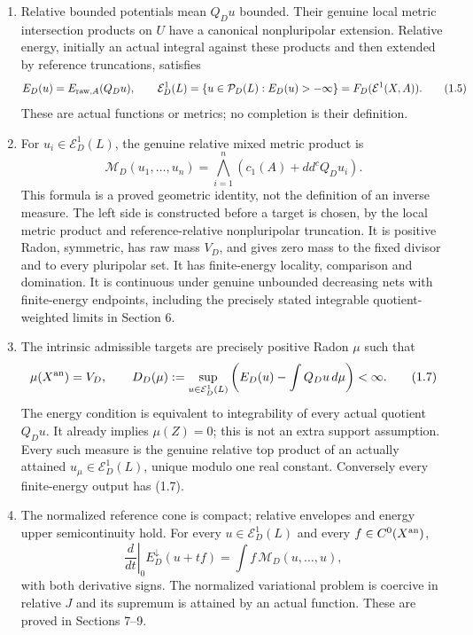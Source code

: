 \documentclass[
  10pt,
]{article}
\begin{document}
\begin{enumerate}
\def\labelenumi{\arabic{enumi}.}
\item
  Relative bounded potentials mean \(Q_Du\) bounded. Their genuine local
  metric intersection products on \(U\) have a canonical nonpluripolar
  extension. Relative energy, initially an actual integral against these
  products and then extended by reference truncations, satisfies \[
   E_D(u)=E_{{\rm raw},A}(Q_Du),\qquad
   \mathcal E_D^1(L)=\{u\in\mathcal P_D(L):E_D(u)>-\infty\}
                      =F_D(\mathcal E^1(X,A)).                \tag{1.5}
  \] These are actual functions or metrics; no completion is their
  definition.
\item
  For \(u_i\in\mathcal E_D^1(L)\), the genuine relative mixed metric
  product is \[
   \mathcal M_D(u_1,\ldots,u_n)
      =\bigwedge_{i=1}^n(c_1(A)+dd^c Q_Du_i).                 \tag{1.6}
  \] This formula is a proved geometric identity, not the definition of
  an inverse measure. The left side is constructed before a target is
  chosen, by the local metric product and reference-relative
  nonpluripolar truncation. It is positive Radon, symmetric, has raw
  mass \(V_D\), and gives zero mass to the fixed divisor and to every
  pluripolar set. It has finite-energy locality, comparison and
  domination. It is continuous under genuine unbounded decreasing nets
  with finite-energy endpoints, including the precisely stated
  integrable quotient-weighted limits in Section 6.
\item
  The intrinsic admissible targets are precisely positive Radon \(\mu\)
  such that \[
   \mu(X^{\rm an})=V_D,\qquad
   D_D(\mu):=\sup_{u\in\mathcal E_D^1(L)}
           \left(E_D(u)-\int Q_Du\,d\mu\right)<\infty.        \tag{1.7}
  \] The energy condition is equivalent to integrability of every actual
  quotient \(Q_Du\). It already implies \(\mu(Z)=0\); this is not an
  extra support assumption. Every such measure is the genuine relative
  top product of an actually attained \(u_\mu\in\mathcal E_D^1(L)\),
  unique modulo one real constant. Conversely every finite-energy output
  has (1.7).
\item
  The normalized reference cone is compact; relative envelopes and
  energy upper semicontinuity hold. For every \(u\in\mathcal E_D^1(L)\)
  and every \(f\in C^0(X^{\rm an})\), \[
   \left.\frac{d}{dt}\right|_{0}E_D^\downarrow(u+tf)
                    =\int f\,\mathcal M_D(u,\ldots,u),       \tag{1.8}
  \] with both derivative signs. The normalized variational problem is
  coercive in relative \(J\) and its supremum is attained by an actual
  function. These are proved in Sections 7--9.
\end{enumerate}
\end{document}
